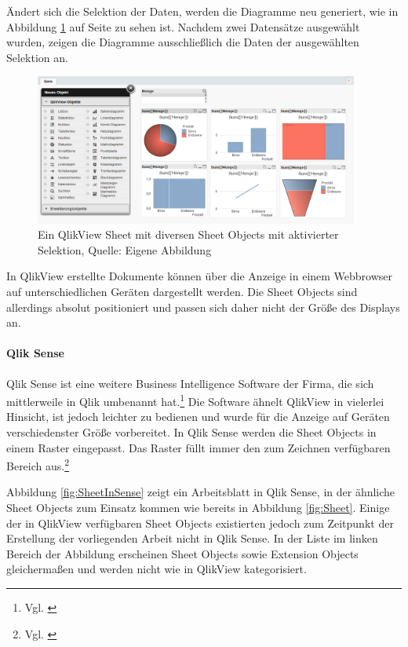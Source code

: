 Ändert sich die Selektion der Daten, werden die Diagramme neu generiert, wie in Abbildung \ref{fig:SheetWithSelection} auf Seite \pageref{fig:SheetWithSelection} zu sehen ist. Nachdem zwei Datensätze ausgewählt wurden, zeigen die Diagramme ausschließlich die Daten der ausgewählten Selektion an.


\begin{figure}[htbp]
	\centering
		\includegraphics[width=0.95\textwidth]{img/QlikView/SheetWithSelection.png}
	\caption[Ein QlikView Sheet mit diversen Sheet Objects mit aktivierter Selektion]{Ein QlikView Sheet mit diversen Sheet Objects mit aktivierter Selektion, Quelle: Eigene Abbildung}
	\label{fig:SheetWithSelection}
\end{figure}

In QlikView erstellte Dokumente können über die Anzeige in einem Webbrowser auf unterschiedlichen Geräten dargestellt werden. Die Sheet Objects sind allerdings absolut positioniert und passen sich daher nicht der Größe des Displays an.

\newpage
\paragraph{Qlik Sense}
Qlik Sense ist eine weitere Business Intelligence Software der Firma, die sich mittlerweile in Qlik umbenannt hat.\footnote{Vgl. \cite{Qlik}} Die Software ähnelt QlikView in vielerlei Hinsicht, ist jedoch leichter zu bedienen und wurde für die Anzeige auf Geräten verschiedenster Größe vorbereitet. In Qlik Sense werden die Sheet Objects in einem Raster eingepasst. Das Raster füllt immer den zum Zeichnen verfügbaren Bereich aus.\footnote{Vgl. \cite[S. 11]{o2014qlik}}

Abbildung \ref{fig:SheetInSense} zeigt ein Arbeitsblatt in Qlik Sense, in der ähnliche Sheet Objects zum Einsatz kommen wie bereits in Abbildung \ref{fig:Sheet}. Einige der in QlikView verfügbaren Sheet Objects existierten jedoch zum Zeitpunkt der Erstellung der vorliegenden Arbeit nicht in Qlik Sense. In der Liste im linken Bereich der Abbildung erscheinen Sheet Objects sowie Extension Objects gleichermaßen und werden nicht wie in QlikView kategorisiert.

